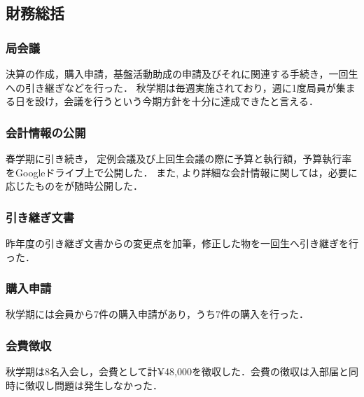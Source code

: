 \subsection*{財務総括}

\subsubsection*{局会議}
決算の作成，購入申請，基盤活動助成の申請及びそれに関連する手続き，一回生への引き継ぎなどを行った．
秋学期は毎週実施されており，週に1度局員が集まる日を設け，会議を行うという今期方針を十分に達成できたと言える．

\subsubsection*{会計情報の公開}
春学期に引き続き， 定例会議及び上回生会議の際に予算と執行額，予算執行率をGoogleドライブ上で公開した．
また, より詳細な会計情報に関しては，必要に応じたものを\kaikeiStaff{}が随時公開した．

\subsubsection*{引き継ぎ文書}
昨年度の引き継ぎ文書からの変更点を加筆，修正した物を一回生へ引き継ぎを行った．

\subsubsection*{購入申請}
秋学期には会員から7件の購入申請があり，うち7件の購入を行った．

\subsubsection*{会費徴収}
秋学期は8名入会し，会費として計¥48,000を徴収した．会費の徴収は入部届と同時に徴収し問題は発生しなかった．
